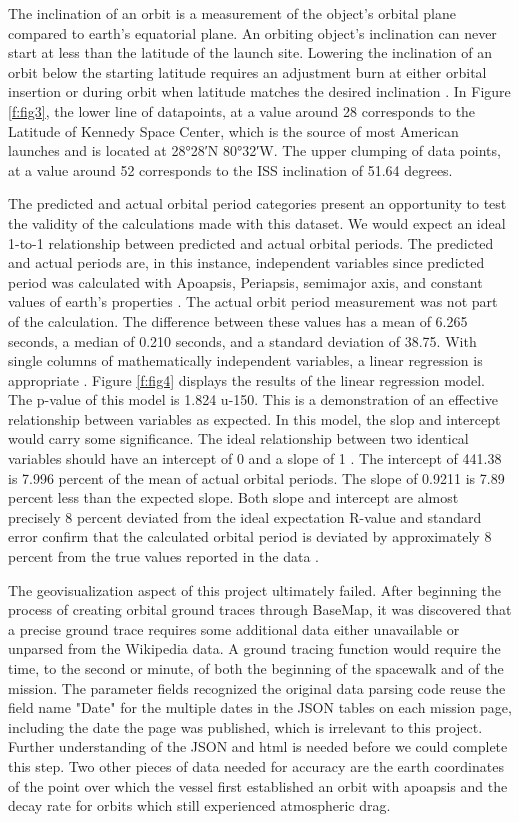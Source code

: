 \documentclass[sigconf]{acmart}
\begin{document}
The inclination of an orbit is a measurement of the object's orbital plane compared to earth's equatorial plane. An orbiting object's inclination can never start at less than the latitude of the launch site. Lowering the inclination of an orbit below the starting latitude requires an adjustment burn at either orbital insertion or during orbit when latitude matches the desired inclination \cite{Davis2012}. In Figure \ref{f:fig3}, the lower line of datapoints, at a value around 28 corresponds to the Latitude of Kennedy Space Center, which is the source of most American launches and is located at 28°28′N 80°32′W. The upper clumping of data points, at a value around 52 corresponds to the ISS inclination of 51.64 degrees. 

The predicted and actual orbital period categories present an opportunity to test the validity of the calculations made with this dataset. We would expect an ideal 1-to-1 relationship between predicted and actual orbital periods. The predicted and actual periods are, in this instance, independent variables since predicted period was calculated with Apoapsis, Periapsis, semimajor axis, and constant values of earth's properties \cite{Wolfson2007,Muirden1982}. The actual orbit period measurement was not part of the calculation. The difference between these values has a mean of 6.265 seconds, a median of 0.210 seconds, and a standard deviation of 38.75. With single columns of mathematically independent variables, a linear regression is appropriate \cite{Community2017}. Figure \ref{f:fig4} displays the results of the linear regression model. The p-value of this model is 1.824 u-150. This is a demonstration of an effective relationship between variables as expected. In this model, the slop and intercept would carry some significance. The ideal relationship between two identical variables should have an intercept of 0 and a slope of 1 \cite{Frost2014}. The intercept of 441.38 is 7.996 percent of the mean of actual orbital periods. The slope of 0.9211 is 7.89 percent less than the expected slope. Both slope and intercept \cite{Frost2014} are almost precisely 8 percent deviated from the ideal expectation R-value and standard error confirm that the calculated orbital period is deviated by approximately 8 percent from the true values reported in the data \cite{Frost2014}. 

The geovisualization aspect of this project ultimately failed. After beginning the process of creating orbital ground traces through BaseMap, it was discovered that a precise ground trace requires some additional data either unavailable or unparsed from the Wikipedia data. A ground tracing function would require the time, to the second or minute, of both the beginning of the spacewalk and of the mission. The parameter fields recognized the original data parsing code reuse the field name "Date" for the multiple dates in the JSON tables on each mission page, including the date the page was published, which is irrelevant to this project. Further understanding of the JSON and html is needed before we could complete this step. Two other pieces of data needed for accuracy are the earth coordinates of the point over which the vessel first established an orbit with apoapsis and the decay rate for orbits which still experienced atmospheric drag. 
\end{document}
